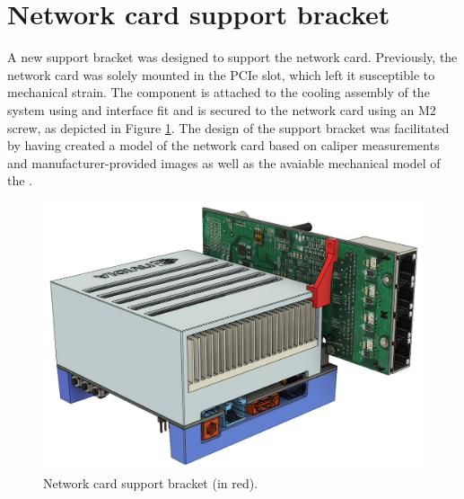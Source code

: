 \clearpage
\section{Network card support bracket}
A new support bracket was designed to support the network card.
Previously, the network card was solely mounted in the PCIe slot, which left it susceptible to mechanical strain.
The component is attached to the cooling assembly of the \jx system using and interface fit and is secured to the network card using an M2 screw, as depicted in Figure \ref{fig:network_card_support}.
The design of the support bracket was facilitated by having created a model of the network card based on caliper measurements and manufacturer-provided images as well as the avaiable mechanical model of the \jx \cite{mucahittoygarNVIDIAJetsonAGX2019}.


\begin{figure}[H]
    \centering
    \includegraphics[width=.6\textwidth]{figures/3d_print/support.jpg}
    \caption{Network card support bracket (in red).}
    \label{fig:network_card_support}
\end{figure}